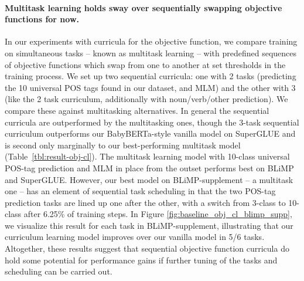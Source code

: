 \paragraph{Multitask learning holds sway over sequentially swapping objective functions for now.}
In our experiments with curricula for the objective function, we compare training on simultaneous tasks -- known as multitask learning \cite{caruana1997multitask} -- with predefined sequences of objective functions which swap from one to another at set thresholds in the training process. We set up two sequential curricula: one with 2 tasks (predicting the 10 universal POS tags found in our dataset, and MLM) and the other with 3 (like the 2 task curriculum, additionally with noun/verb/other prediction). We compare these against multitasking alternatives. In general the sequential curricula are outperformed by the multitasking ones, though the 3-task sequential curriculum outperforms our BabyBERTa-style vanilla model on SuperGLUE and is second only marginally to our best-performing multitask model (Table~\ref{tbl:result-obj-cl}). The multitask learning model with 10-class universal POS-tag prediction and MLM in place from the outset performs best on BLiMP and SuperGLUE. However, our best model on BLiMP-supplement -- a multitask one -- has an element of sequential task scheduling in that the two POS-tag prediction tasks are lined up one after the other, with a switch from 3-class to 10-class after 6.25\% of training steps. In Figure \ref{fig:baseline_obj_cl_blimp_supp}, we visualize this result for each task in BLiMP-supplement, illustrating that our curriculum learning model improves over our vanilla model in 5/6 tasks.
Altogether, these results suggest that sequential objective function curricula do hold some potential for performance gains if further tuning of the tasks and scheduling can be carried out.

